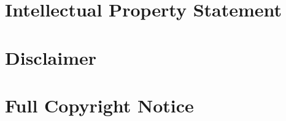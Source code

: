 \documentclass[10pt,a4paper]{article}
\begin{document}
%

\section{Intellectual Property Statement}


\section{Disclaimer}


\section{Full Copyright Notice}




\end{document}

